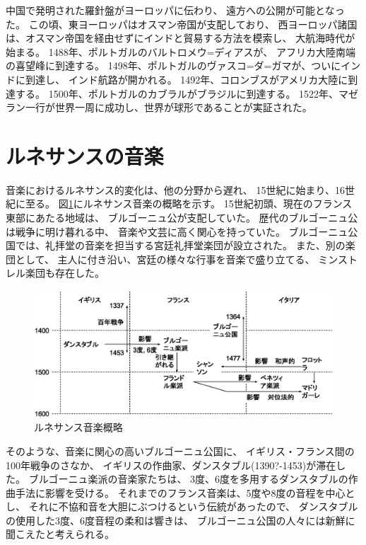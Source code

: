 \documentclass[a4j]{jarticle}
\begin{document}
中国で発明された羅針盤がヨーロッパに伝わり、
遠方への公開が可能となった。
この頃、東ヨーロッパはオスマン帝国が支配しており、
西ヨーロッパ諸国は、オスマン帝国を経由せずにインドと貿易する方法を模索し、
大航海時代が始まる。
1488年、ポルトガルのバルトロメウ=ディアスが、
アフリカ大陸南端の喜望峰に到達する。
1498年、ポルトガルのヴァスコ=ダ=ガマが、ついにインドに到達し、
インド航路が開かれる。
1492年、コロンブスがアメリカ大陸に到達する。
1500年、ポルトガルのカブラルがブラジルに到達する。
1522年、マゼラン一行が世界一周に成功し、世界が球形であることが実証された。





\section{ルネサンスの音楽}

音楽におけるルネサンス的変化は、他の分野から遅れ、
15世紀に始まり、16世紀に至る。
図\ref{fig:renaissance_summary}にルネサンス音楽の概略を示す。
15世紀初頭、現在のフランス東部にあたる地域は、
ブルゴーニュ公が支配していた。
歴代のブルゴーニュ公は戦争に明け暮れる中、
音楽や文芸に高く関心を持っていた。
ブルゴーニュ公国では、礼拝堂の音楽を担当する宮廷礼拝堂楽団が設立された。
また、別の楽団として、
主人に付き沿い、宮廷の様々な行事を音楽で盛り立てる、
ミンストレル楽団も存在した。

\begin{figure}[tb]
 \begin{center}
  \includegraphics[width=\hsize]{fig/renaissance_summary.eps}
  \caption{ルネサンス音楽概略}
  \label{fig:renaissance_summary}
 \end{center}
\end{figure}

そのような、音楽に関心の高いブルゴーニュ公国に、
イギリス・フランス間の100年戦争のさなか、
イギリスの作曲家、ダンスタブル(1390?-1453)が滞在した。
ブルゴーニュ楽派の音楽家たちは、
3度、6度を多用するダンスタブルの作曲手法に影響を受ける。
それまでのフランス音楽は、5度や8度の音程を中心とし、
それに不協和音を大胆にぶつけるという伝統があったので、
ダンスタブルの使用した3度、6度音程の柔和は響きは、
ブルゴーニュ公国の人々には新鮮に聞こえたと考えられる。
\end{document}
